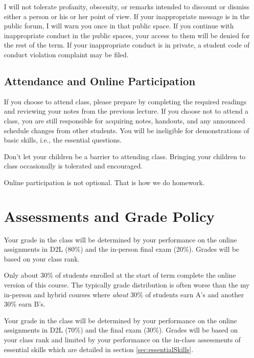 \documentclass[letterpaper,10pt]{article}
\newif\ifonline
\begin{document}
I will not tolerate profanity, obscenity, or remarks intended to
discount or dismiss either a person or his or her point of view. If your inappropriate message is in the public forum, I will warn you
once in that public space. If you continue with inappropriate conduct
in the public spaces, your access to them will be denied for the rest
of the term. If your inappropriate
conduct is in private, a student code of conduct violation complaint
may be filed.

\ifonline

\else
   \subsection{Attendance and Online Participation}
   
   If you choose to attend class, please prepare by completing the required readings and reviewing your notes from the previous lecture. If you choose not to attend a class, you are still responsible for acquiring notes, handouts, and any announced schedule changes from other students. You will be ineligible for demonstrations of basic skills, i.e., the essential questions. 
   
   Don’t let your children be a barrier to attending class. Bringing your children to class occasionally is tolerated and encouraged.
  
  Online participation is not optional. That is how we do homework.

\fi

\section{Assessments and Grade Policy}

\ifonline
  Your grade in the class will be determined by your performance on the online assignments in D2L (80\%) and the in-person final exam (20\%).  Grades will be based on your class rank.

  Only about 30\% of students enrolled at the start of term complete the online version of this course.  The typically grade distribution is often worse than the my in-person and hybrid courses where \emph{about} 30\% of students earn A's and another 30\% earn B's.

\else
  Your grade in the class will be determined by your performance on the online assignments in D2L (70\%) and the final exam (30\%).  Grades will be based on your class rank and limited by your performance on the in-class assessments of essential skills which are detailed in section \ref{sec:essentialSkills}. 
  
\end{document}
